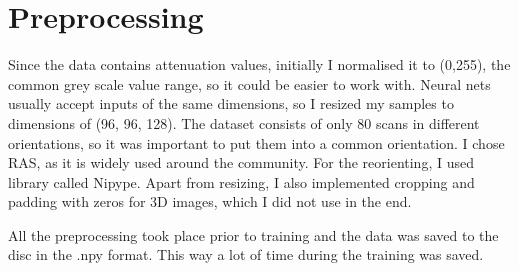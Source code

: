 \section{Preprocessing}
Since the data contains attenuation values, initially I normalised it to (0,255), the common grey scale value range, so it could be easier to work with. Neural nets usually accept inputs of the same dimensions, so I resized my samples to dimensions of (96, 96, 128). The dataset consists of only 80 scans in different orientations, so it was important to put them into a common orientation. I chose RAS, as it is widely used around the community. For the reorienting, I used library called Nipype\cite{nipype}. Apart from resizing, I also implemented cropping and padding with zeros for 3D images, which I did not use in the end.

All the preprocessing took place prior to training and the data was saved to the disc in the .npy format. This way a lot of time during the training was saved. 